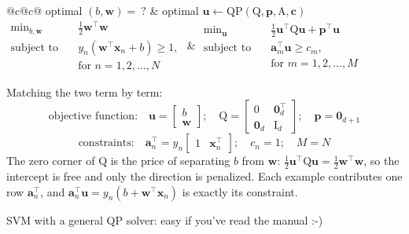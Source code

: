 \begin{center}
    \begin{tabular}{@{}c@{\qquad}c@{}}
        optimal \((b, \bm{w}) = \ ?\) & optimal \(\bm{u} \gets
            \mathrm{QP}(\mathrm{Q}, \bm{p}, \mathrm{A}, \bm{c})\)\\[6pt]
        \(\begin{aligned}
            \min_{b, \bm{w}} \quad & \tfrac{1}{2} \bm{w}^\top \bm{w}\\
            \text{subject to} \quad & y_n (\bm{w}^\top \bm{x}_n + b) \ge 1,\\
            & \text{for } n = 1, 2, \dots , N
        \end{aligned}\)
        &
        \(\begin{aligned}
            \min_{\bm{u}} \quad & \tfrac{1}{2} \bm{u}^\top \mathrm{Q} \bm{u}
                + \bm{p}^\top \bm{u}\\
            \text{subject to} \quad & \bm{a}_m^\top \bm{u} \ge c_m,\\
            & \text{for } m = 1, 2, \dots , M
        \end{aligned}\)
    \end{tabular}
\end{center}

Matching the two term by term:
\[
    \text{objective function:} \quad
    \bm{u} = \begin{bmatrix} b \\ \bm{w} \end{bmatrix}; \quad
    \mathrm{Q} = \begin{bmatrix} 0 & \bm{0}_d^\top \\ \bm{0}_d &
    \mathrm{I}_d \end{bmatrix}; \quad
    \bm{p} = \bm{0}_{d+1}
\]
\[
    \text{constraints:} \quad
    \bm{a}_n^\top = y_n \begin{bmatrix} 1 & \bm{x}_n^\top \end{bmatrix};
    \quad c_n = 1; \quad M = N
\]
The zero corner of \(\mathrm{Q}\) is the price of separating \(b\) from
\(\bm{w}\): \(\frac{1}{2} \bm{u}^\top \mathrm{Q} \bm{u} = \frac{1}{2}
\bm{w}^\top \bm{w}\), so the intercept is free and only the direction is
penalized. Each example contributes one row \(\bm{a}_n^\top\), and
\(\bm{a}_n^\top \bm{u} = y_n (b + \bm{w}^\top \bm{x}_n)\) is exactly its
constraint.

\begin{moral}
    SVM with a general QP solver: easy if you've read the manual :-)
\end{moral}

